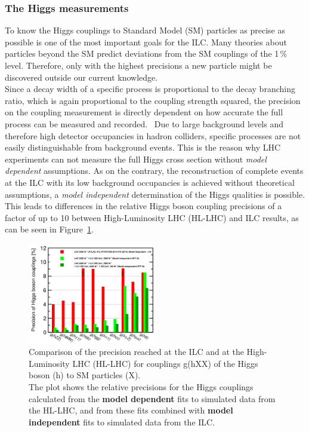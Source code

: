 \subsubsection{The Higgs measurements}
To know the Higgs couplings to Standard Model (SM) particles as precise as possible is one of the most important goals for the ILC.
Many theories about particles beyond the SM predict deviations from the SM couplings of the 1\,\% level.
Therefore, only with the highest precisions a new particle might be discovered outside our current knowledge.\\
Since a decay width of a specific process is proportional to the decay branching ratio, which is again proportional to the coupling strength squared, the precision on the coupling measurement is directly dependent on how accurate the full process can be measured and recorded.~\cite{PhysicsCase}
Due to large background levels and therefore high detector occupancies in hadron colliders, specific processes are not easily distinguishable from background events.
This is the reason why LHC experiments can not measure the full Higgs cross section without \textit{model dependent} assumptions.
As on the contrary, the reconstruction of complete events at the ILC with its low background occupancies is achieved without theoretical assumptions, a \textit{model independent} determination of the Higgs qualities is possible.\\
This leads to differences in the relative Higgs boson coupling precisions of a factor of up to 10 between High-Luminosity LHC (HL-LHC) and ILC results, as can be seen in Figure~\ref{fig:Higgs_couplings}.
\begin{figure}[h]
\centering
\includegraphics[width=0.5\textwidth]{Figures/Higgs_couplings.png}
\caption[Higgs coupling precisions]{Comparison of the precision reached at the ILC and at the High-Luminosity LHC (HL-LHC) for couplings g(hXX) of the Higgs boson (h) to SM particles (X).~\cite[p. 17]{PhysicsCase}\\
The plot shows the relative precisions for the Higgs couplings calculated from the \textbf{model dependent} fits to simulated data from the HL-LHC, and from these fits combined with \textbf{model independent} fits to simulated data from the ILC.}
\label{fig:Higgs_couplings}
\end{figure}

